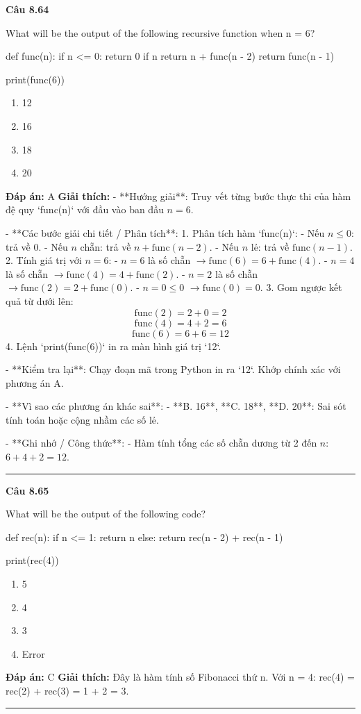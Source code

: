 \documentclass[11pt,a4paper]{article}
\newenvironment{question}[1]{%
  \par\vspace{1em}\noindent\textbf{\large Câu #1}\par\vspace{0.4em}
}{%
  \par\vspace{1em}\hrule\vspace{0.6em}
}
\newenvironment{choices}{%
  \begin{enumerate}[label=\textbf{\Alph*.},leftmargin=2.2em,itemsep=2pt,topsep=3pt]
}{%
  \end{enumerate}
}
\newcommand{\choice}{\item}
\newenvironment{codebox}{%
  \begin{tcolorbox}[colback=gray!8!white,colframe=gray!50!black,arc=1.5mm,boxrule=0.6pt,left=3mm,right=3mm,top=2.5mm,bottom=2.5mm]
  \ttfamily\small
}{%
  \end{tcolorbox}
}
\begin{document}
\begin{question}{8.64}
What will be the output of the following recursive function when n = 6?
\begin{codebox}
def func(n):
    if n <= 0:
        return 0
    if n %
        return n + func(n - 2)
    return func(n - 1)

print(func(6))
\end{codebox}
\begin{choices}
\choice 12
\choice 16
\choice 18
\choice 20
\end{choices}
\textbf{Đáp án:} A
\textbf{Giải thích:} - **Hướng giải**:
  Truy vết từng bước thực thi của hàm đệ quy `func(n)` với đầu vào ban đầu \(n = 6\).

- **Các bước giải chi tiết / Phân tích**:
  1. Phân tích hàm `func(n)`:
     - Nếu \(n \le 0\): trả về 0.
     - Nếu \(n\) chẵn: trả về \(n + \text{func}(n - 2)\).
     - Nếu \(n\) lẻ: trả về \(\text{func}(n - 1)\).
  2. Tính giá trị với \(n = 6\):
     - \(n = 6\) là số chẵn \(\rightarrow \text{func}(6) = 6 + \text{func}(4)\).
     - \(n = 4\) là số chẵn \(\rightarrow \text{func}(4) = 4 + \text{func}(2)\).
     - \(n = 2\) là số chẵn \(\rightarrow \text{func}(2) = 2 + \text{func}(0)\).
     - \(n = 0 \le 0\) \(\rightarrow \text{func}(0) = 0\).
  3. Gom ngược kết quả từ dưới lên:
     \[ \text{func}(2) = 2 + 0 = 2 \]
     \[ \text{func}(4) = 4 + 2 = 6 \]
     \[ \text{func}(6) = 6 + 6 = 12 \]
  4. Lệnh `print(func(6))` in ra màn hình giá trị `12`.

- **Kiểm tra lại**:
  Chạy đoạn mã trong Python in ra `12`.
  Khớp chính xác với phương án A.

- **Vì sao các phương án khác sai**:
  - **B. 16**, **C. 18**, **D. 20**: Sai sót tính toán hoặc cộng nhầm các số lẻ.

- **Ghi nhớ / Công thức**:
  - Hàm tính tổng các số chẵn dương từ 2 đến \(n\): \(6 + 4 + 2 = 12\).
\end{question}

\begin{question}{8.65}
What will be the output of the following code?
\begin{codebox}
def rec(n):
    if n <= 1:
        return n
    else:
        return rec(n - 2) + rec(n - 1)

print(rec(4))
\end{codebox}
\begin{choices}
\choice 5
\choice 4
\choice 3
\choice Error
\end{choices}
\textbf{Đáp án:} C
\textbf{Giải thích:} Đây là hàm tính số Fibonacci thứ n. Với n = 4: rec(4) = rec(2) + rec(3) = 1 + 2 = 3.
\end{question}
\end{document}
